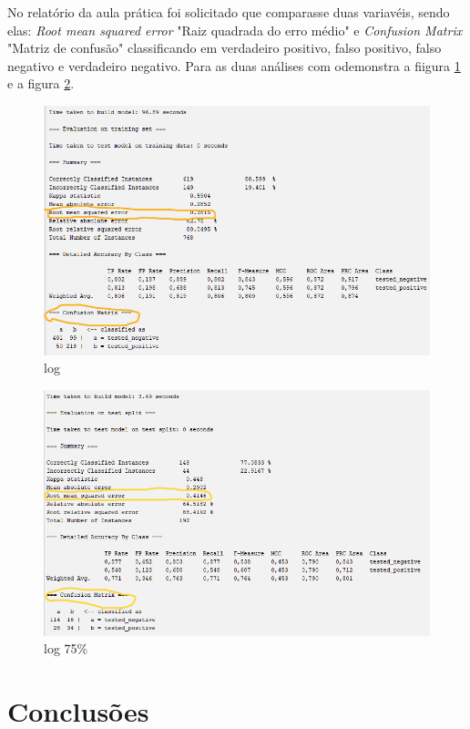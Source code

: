 \par No relatório da aula prática foi solicitado que comparasse duas variavéis, sendo elas: \textit{Root mean squared error} "Raiz quadrada do erro médio" e \textit{Confusion Matrix} "Matriz de confusão" classificando em verdadeiro positivo, falso positivo, falso negativo e verdadeiro negativo. Para as duas análises com odemonstra a fiigura \ref{fig:normal} e a figura \ref{fig:75erro}.
\begin{figure}[h!]
  \center
  \includegraphics[scale=0.6]{figure/result_true3.png}
  \caption{log}\label{fig:normal}
\end{figure}

\begin{figure}[h!]
  \center
  \includegraphics[scale=0.6]{figure/result_true_75p.png}
  \caption{log 75\%}\label{fig:75erro}
\end{figure}
\section{Conclusões}




